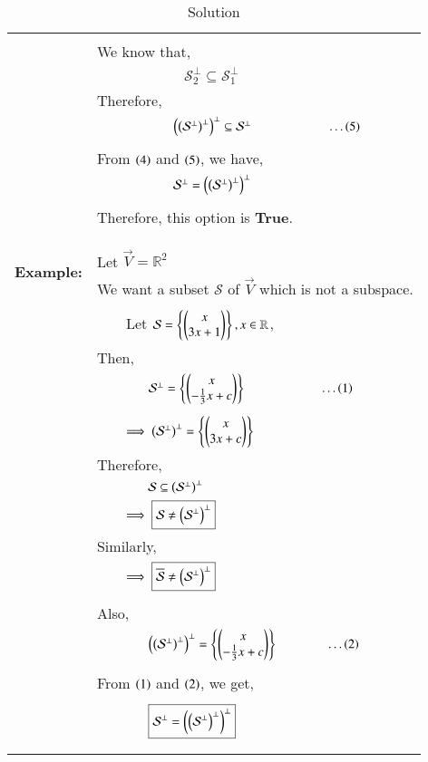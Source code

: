 \documentclass[journal,12pt]{IEEEtran}
\begin{document}
\begin{longtable}{|c|l|}
	&\\
	&We know that,\\
	&$\qquad\qquad\qquad\mathcal{S}_{2}^{\perp}\subseteq\mathcal{S}_{1}^{\perp}$\\
	&Therefore,\\
	&$\qquad\qquad\qquad\left(\left(\mathcal{S}^{\perp}\right)^{\perp}\right)^{\perp}\subseteq\mathcal{S}^{\perp}\qquad\qquad\qquad\dots\left(5\right)$\\
	&\\
	&From $\left(4\right)$ and $\left(5\right)$, we have,\\
	&$\qquad\qquad\qquad\mathcal{S}^{\perp}=\left(\left(\mathcal{S}^{\perp}\right)^{\perp}\right)^{\perp}$\\
	&\\
	&Therefore, this option is \textbf{True}.\\
	&\\
	\hline
	&\\
	\multirow{3}{*}{\textbf{Example:}}
	&\\
	&Let $\Vec{V}=\mathbb{R}^2$\\
	&We want a subset $\mathcal{S}$ of $\vec{V}$ which is not a subspace.\\
	&\\
	&$\qquad$Let $\mathcal{S}=\left\{\begin{pmatrix}x\\3x+1\end{pmatrix}\right\}, x\in\mathbb{R}$,\\
	&Then,\\
	&$\qquad\qquad\mathcal{S}^{\perp}=\left\{\begin{pmatrix}x\\-\frac{1}{3}x+c\end{pmatrix}\right\}\qquad\qquad\qquad\dots\left(1\right)$\\
	&\\
	&$\qquad\implies\left(\mathcal{S}^{\perp}\right)^{\perp}=\left\{\begin{pmatrix}x\\3x+c\end{pmatrix}\right\}$\\
	&Therefore,\\
	&$\qquad\qquad\mathcal{S}\subseteq\left(\mathcal{S}^{\perp}\right)^{\perp}$\\
	&$\qquad\implies\boxed{\mathcal{S}\neq\left(\mathcal{S}^{\perp}\right)^{\perp}}$\\
	&Similarly,\\
	&$\qquad\implies\boxed{\overline{\mathcal{S}}\neq\left(\mathcal{S}^{\perp}\right)^{\perp}}$\\
	&\\
	&Also,\\
	&$\qquad\qquad\left(\left(\mathcal{S}^{\perp}\right)^{\perp}\right)^{\perp}=\left\{\begin{pmatrix}x\\-\frac{1}{3}x+c\end{pmatrix}\right\}\qquad\qquad\dots\left(2\right)$\\
	&\\
	&From $\left(1\right)$ and $\left(2\right)$, we get,\\
	&\\
	&$\qquad\qquad\boxed{\mathcal{S}^{\perp}=\left(\left(\mathcal{S}^{\perp}\right)^{\perp}\right)^{\perp}}$\\
	&\\
	\hline
	\caption{Solution}
    \label{table:2}
\end{longtable}
\newpage
\end{document}

